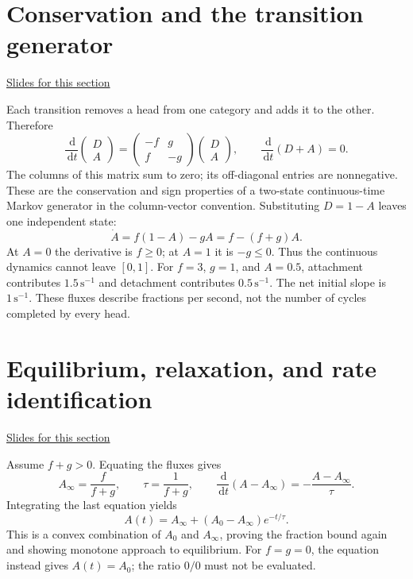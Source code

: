 \documentclass[11pt,letterpaper]{article}
\providecommand{\dd}{\,\mathrm{d}}\providecommand{\R}{\mathbb{R}}
\theoremstyle{definition}\newtheorem{definition}{Definition}\newtheorem{example}{Example}
\numberwithin{equation}{section}
\begin{document}
\section{Conservation and the transition generator}
\hypertarget{note-conservation-and-the-transition-generator}{}\label{note:conservation-and-the-transition-generator}
{\small \href{slides.html\#frame=transition-fluxes-figure\&step=1}{Slides for this section}}\par
Each transition removes a head from one category and adds it to the other. Therefore
\[
\frac{\dd}{\dd t}\begin{pmatrix}D\\A\end{pmatrix}
=\begin{pmatrix}-f&g\\ f&-g\end{pmatrix}\begin{pmatrix}D\\A\end{pmatrix},
\qquad \frac{\dd}{\dd t}(D+A)=0.
\]
The columns of this matrix sum to zero; its off-diagonal entries are nonnegative. These are the conservation and sign properties of a two-state continuous-time Markov generator in the column-vector convention. Substituting $D=1-A$ leaves one independent state:
\[
\boxed{\dot A=f(1-A)-gA=f-(f+g)A.}
\]
At $A=0$ the derivative is $f\geq0$; at $A=1$ it is $-g\leq0$. Thus the continuous dynamics cannot leave $[0,1]$. For $f=3$, $g=1$, and $A=0.5$, attachment contributes $1.5\,\mathrm{s}^{-1}$ and detachment contributes $0.5\,\mathrm{s}^{-1}$. The net initial slope is $1\,\mathrm{s}^{-1}$. These fluxes describe fractions per second, not the number of cycles completed by every head.
\section{Equilibrium, relaxation, and rate identification}
\hypertarget{note-equilibrium-relaxation-and-rate-identification}{}\label{note:equilibrium-relaxation-and-rate-identification}
{\small \href{slides.html\#frame=equilibrium-with-continuing-turnover\&step=1}{Slides for this section}}\par
Assume $f+g>0$. Equating the fluxes gives
\[
A_\infty=\frac{f}{f+g},\qquad \tau=\frac1{f+g},\qquad
\frac{\dd}{\dd t}(A-A_\infty)=-\frac{A-A_\infty}{\tau}.
\]
Integrating the last equation yields
\[
A(t)=A_\infty+(A_0-A_\infty)e^{-t/\tau}.
\]
This is a convex combination of $A_0$ and $A_\infty$, proving the fraction bound again and showing monotone approach to equilibrium. For $f=g=0$, the equation instead gives $A(t)=A_0$; the ratio $0/0$ must not be evaluated.
\end{document}
